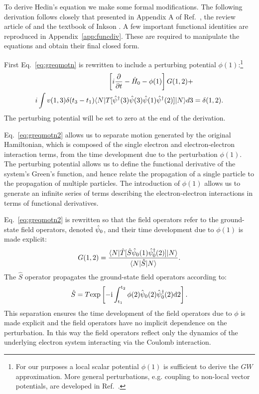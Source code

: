 To derive Hedin's equation we make some formal modifications. The following derivation follows closely
that presented in Appendix A of Ref.~\cite{hedin65}, the review article of \cite{strinati88} 
and the textbook of Inkson \cite{inkson86}. A few important functional identities 
are reproduced in Appendix~\ref{app:funcdiv}. These are required to manipulate the equations 
and obtain their final closed form.

First Eq.~\ref{eq:greqmotn} is rewritten to include a perturbing potential $\phi(1)$:\footnote{For our
purposes a local scalar potential $\phi(1)$ is sufficient to derive the $GW$ approximation. More general 
perturbations, e.g. coupling to non-local vector potentials, are developed in Ref.~\cite{strinati88}.}
%
\begin{align}
\label{eq:greqmotn2}
\left[i\frac{\partial}{\partial t} - \hat{H}_{0} - \phi(1)\right]G(1,2) +& \nonumber \\
i\int v(1,3)\delta(t_{3}-t_{1})\langle N| T[\hat{\psi}^{\dagger}(3)\hat{\psi}(3)\hat{\psi}(1)\hat{\psi}^{\dagger}(2)] |N \rangle d3 &= \delta(1,2).
\end{align}
%
The perturbing potential will be set to zero at the end of the derivation.

Eq.~\ref{eq:greqmotn2} allows us to separate motion generated by the original Hamiltonian, 
which is composed of the single electron and electron-electron
interaction terms, from the time development due to the perturbation $\phi(1)$. The perturbing potential 
allows us to define the functional derivative of the system's Green's
function, and hence relate the propagation of a single particle to the propagation of multiple particles. 
The introduction of $\phi(1)$ allows us to generate an infinite series of terms 
describing the electron-electron interactions in terms of functional derivatives.

Eq.~\ref{eq:greqmotn2} is rewritten so that the field operators refer to the ground-state field
operators, denoted $\hat{\psi}_{0}$, and their time development due to $\phi(1)$ is made explicit:
%
\begin{equation}
\label{eq:intergr}
G(1,2) =  \frac{\langle N|\hat{T}[\hat{S}\hat{\psi}_{0}(1)\hat{\psi}^{\dagger}_{0}(2)]|N\rangle}{\langle N| \hat{S} |N\rangle}.
\end{equation}
%
The $\hat{S}$ operator propagates the ground-state field operators according to:
%
\begin{equation}
\hat{S} = T\rm{exp}\left[-i\int_{t_{1}}^{t_{2}} \phi(2)\hat{\psi}_{0}(2)\hat{\psi}^{\dagger}_{0}(2)d{2}\right].
\end{equation}
%
This separation ensures the time development of the field operators due to $\phi$ is made explicit
and the field operators have no implicit dependence on the perturbation. In this way the field 
operators reflect only the dynamics of the underlying electron system interacting via the Coulomb interaction.

